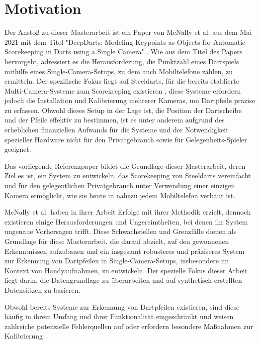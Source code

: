 \section{Motivation}
\label{sec:motivation}

Der Anstoß zu dieser Masterarbeit ist ein Paper von McNally et al. aus dem Mai 2021 mit dem Titel "DeepDarts: Modeling Keypoints as Objects for Automatic Scorekeeping in Darts using a Single Camera" \cite{deepdarts}. Wie aus dem Titel des Papers hervorgeht, adressiert es die Herausforderung, die Punktzahl eines Dartspiels mithilfe eines Single-Camera-Setups, zu dem auch Mobiltelefone zählen, zu ermitteln. Der spezifische Fokus liegt auf Steeldarts, für die bereits etablierte Multi-Camera-Systeme zum Scorekeeping existieren \cite{autodarts, scoliadarts}, diese Systeme erfordern jedoch die Installation und Kalibrierung mehrerer Kameras, um Dartpfeile präzise zu erfassen. Obwohl dieses Setup in der Lage ist, die Position der Dartscheibe und der Pfeile effektiv zu bestimmen, ist es unter anderem aufgrund des erheblichen finanziellen Aufwands für die Systeme und der Notwendigkeit spezieller Hardware nicht für den Privatgebrauch sowie für Gelegenheits-Spieler geeignet.

Das vorliegende Referenzpaper bildet die Grundlage dieser Masterarbeit, deren Ziel es ist, ein System zu entwickeln, das Scorekeeping von Steeldarts vereinfacht und für den gelegentlichen Privatgebrauch unter Verwendung einer einzigen Kamera ermöglicht, wie sie heute in nahezu jedem Mobiltelefon verbaut ist.

McNally et al. haben in ihrer Arbeit Erfolge mit ihrer Methodik erzielt, dennoch existieren einige Herausforderungen und Ungereimtheiten, bei denen ihr System ungenaue Vorhersagen trifft. Diese Schwachstellen und Grenzfälle dienen als Grundlage für diese Masterarbeit, die darauf abzielt, auf den gewonnenen Erkenntnissen aufzubauen und ein insgesamt robusteres und präziseres System zur Erkennung von Dartpfeilen in Single-Camera-Setups, insbesondere im Kontext von Handyaufnahmen, zu entwickeln. Der spezielle Fokus dieser Arbeit liegt darin, die Datengrundlage zu überarbeiten und auf synthetisch erstellten Datensätzen zu basieren.

Obwohl bereits Systeme zur Erkennung von Dartpfeilen existieren, sind diese häufig in ihrem Umfang und ihrer Funktionalität eingeschränkt und weisen zahlreiche potenzielle Fehlerquellen auf oder erfordern besondere Maßnahmen zur Kalibrierung \cite{darts_project, opencv_steel_darts, dartscore_repo}.

